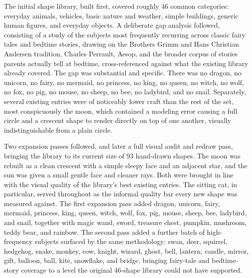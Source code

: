 \documentclass[conference]{IEEEtran}
\begin{document}
The initial shape library, built first, covered roughly 46 common categories: everyday animals, vehicles, basic nature and weather, simple buildings, generic human figures, and everyday objects. A deliberate gap analysis followed, consisting of a study of the subjects most frequently recurring across classic fairy tales and bedtime stories, drawing on the Brothers Grimm and Hans Christian Andersen tradition, Charles Perrault, Aesop, and the broader corpus of stories parents actually tell at bedtime, cross-referenced against what the existing library already covered. The gap was substantial and specific. There was no dragon, no unicorn, no fairy, no mermaid, no princess, no king, no queen, no witch, no wolf, no fox, no pig, no mouse, no sheep, no bee, no ladybird, and no snail. Separately, several existing entries were of noticeably lower craft than the rest of the set, most conspicuously the moon, which contained a modeling error causing a full circle and a crescent shape to render directly on top of one another, visually indistinguishable from a plain circle.

Two expansion passes followed, and later a full visual audit and redraw pass, bringing the library to its current size of 93 hand-drawn shapes. The moon was rebuilt as a clean crescent with a simple sleepy face and an adjacent star, and the sun was given a small gentle face and cleaner rays. Both were brought in line with the visual quality of the library's best existing entries. The sitting cat, in particular, served throughout as the informal quality bar every new shape was measured against. The first expansion pass added dragon, unicorn, fairy, mermaid, princess, king, queen, witch, wolf, fox, pig, mouse, sheep, bee, ladybird, and snail, together with magic wand, sword, treasure chest, pumpkin, mushroom, teddy bear, and rainbow. The second pass added a further batch of high-frequency subjects surfaced by the same methodology: swan, deer, squirrel, hedgehog, snake, monkey, cow, knight, wizard, ghost, bell, lantern, candle, mirror, gift, balloon, ball, kite, snowflake, and bridge, bringing fairy-tale and bedtime-story coverage to a level the original 46-shape library could not have supported.
\end{document}

